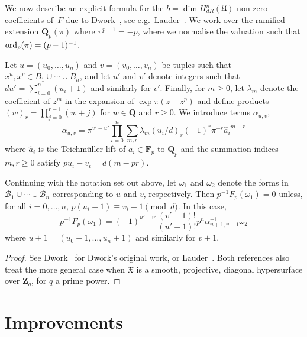 We now describe an explicit formula for the $b = \dim H_{dR}^n(\mathfrak{U})$ 
non-zero coefficients of~$F$ due to Dwork~\citep{Dwork64}, see e.g.\ 
Lauder~\citep[\S 6.1]{Lau04}.   We work over the ramified extension 
$\mathbf{Q}_p(\pi)$ where $\pi^{p-1} = -p$, where we normalise the valuation 
such that $\operatorname{ord}_p(\pi) = (p-1)^{-1}$.

Let $u = (u_0, \dotsc, u_n)$ and $v = (v_0, \dotsc, v_n)$ be tuples such 
that $x^u, x^v \in B_1 \cup \dotsb \cup B_n$,  and let $u'$ and $v'$ 
denote integers such that $d u' = \sum_{i=0}^n (u_i + 1)$ and similarly 
for $v'$.  Finally, for $m \geq 0$, let $\lambda_m$ denote the coefficient 
of $z^m$ in the expansion of $\exp \pi (z - z^p)$ and define products 
$(w)_r = \prod_{j=0}^{r-1} (w + j)$ for $w \in \mathbf{Q}$ and $r \geq 0$. 
We introduce terms $\alpha_{u,v}$, 
\begin{equation*}
\alpha_{u,v} = \pi^{v' - u'} \prod_{i = 0}^n \sum_{m, r} \lambda_m (u_i / d)_r (-1)^r \pi^{-r} {\hat{a}_i}^{m-r}
\end{equation*}
where $\hat{a}_i$ is the Teichm\"uller lift of $a_i \in \mathbf{F}_p$ 
to $\mathbf{Q}_p$ and the summation indices $m, r \geq 0$ satisfy 
$p u_i - v_i = d (m - pr)$.

\begin{thm} \label{thm:01-04-diagfrob}
Continuing with the notation set out above, let $\omega_1$ and $\omega_2$ 
denote the forms in $\mathcal{B}_1 \cup \dotsb \cup \mathcal{B}_n$ 
corresponding to $u$ and $v$, respectively.  
Then $p^{-1} F_p (\omega_1) = 0$ unless, for all $i = 0, \dotsc, n$, 
$p (u_i + 1) \equiv v_i + 1 \pmod{d}$.  In this case, 
\begin{equation*}
p^{-1} F_p (\omega_1) = 
    (-1)^{u' + v'} \frac{(v' - 1)!}{(u' - 1)!} p^n \alpha_{u+1,v+1}^{-1} \omega_2
\end{equation*}
where $u + 1 = (u_0 + 1, \dotsc, u_n + 1)$ and similarly for $v + 1$.
\end{thm}

\begin{proof}
See Dwork~\citep[\S 4]{Dwork64} for Dwork's original work, or 
Lauder~\citep[\S 6.1]{Lau04}.  Both references also treat the 
more general case when $\mathfrak{X}$ is a smooth, projective, 
diagonal hypersurface over $\mathbf{Z}_q$, for $q$ a prime power.
\end{proof}


\section{Improvements}

